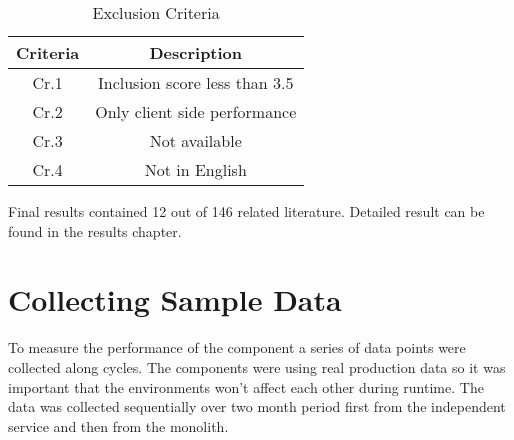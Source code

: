 \begin{table}[ht!]
    \begin{tabular}{|c c|} 
        \hline
        Criteria & Description \\ [0.5ex] 
        \hline\hline
        Cr.1 & Inclusion score less than 3.5 \\
        
        Cr.2 & Only client side performance  \\
        
        Cr.3 & Not available \\
        
        Cr.4 & Not in English \\
        \hline
    \end{tabular}    
    \caption{Exclusion Criteria}
    \label{table:literature:exclusionCriteria}
\end{table}

Final results contained 12 out of 146 related literature.
Detailed result can be found in the results chapter.

\section{Collecting Sample Data}
To measure the performance of the component a series of data points were collected along cycles.
The components were using real production data so it was important that the environments won't affect each other during runtime.
The data was collected sequentially over two month period first from the independent service and then from the monolith.

